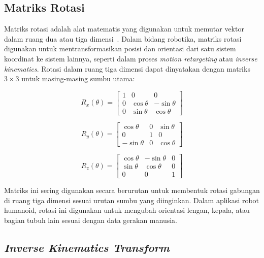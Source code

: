 \subsection{Matriks Rotasi}

Matriks rotasi adalah alat matematis yang digunakan untuk memutar vektor dalam ruang dua atau tiga dimensi~. Dalam bidang robotika, matriks rotasi digunakan untuk mentransformasikan posisi dan orientasi dari satu sistem koordinat ke sistem lainnya, seperti dalam proses \textit{motion retargeting} atau \textit{inverse kinematics}. Rotasi dalam ruang tiga dimensi dapat dinyatakan dengan matriks $3\times3$ untuk masing-masing sumbu utama:

\begin{equation}
R_x(\theta) =
\begin{bmatrix}
1 & 0 & 0 \\
0 & \cos\theta & -\sin\theta \\
0 & \sin\theta & \cos\theta
\end{bmatrix}
\end{equation}

\begin{equation}
R_y(\theta) =
\begin{bmatrix}
\cos\theta & 0 & \sin\theta \\
0 & 1 & 0 \\
-\sin\theta & 0 & \cos\theta
\end{bmatrix}
\end{equation}

\begin{equation}
R_z(\theta) =
\begin{bmatrix}
\cos\theta & -\sin\theta & 0 \\
\sin\theta & \cos\theta & 0 \\
0 & 0 & 1
\end{bmatrix}
\end{equation}

Matriks ini sering digunakan secara berurutan untuk membentuk rotasi gabungan di ruang tiga dimensi sesuai urutan sumbu yang diinginkan. Dalam aplikasi robot humanoid, rotasi ini digunakan untuk mengubah orientasi lengan, kepala, atau bagian tubuh lain sesuai dengan data gerakan manusia.

\subsection{\textit{Inverse Kinematics Transform}}


